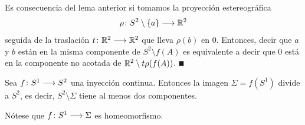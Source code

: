 \documentclass[GTS.tex]{subfiles}
\begin{document}
\begin{dem}
Es consecuencia del lema anterior si tomamos la proyección estereográfica \[\rho\colon{S^2\setminus\{a\}}\longrightarrow{\mathbb{R}^2}\] seguida de la traslación $t\colon{\mathbb{R}^2}\longrightarrow{\mathbb{R}^2}$ que lleva $\rho(b)$ en $0$. Entonces, decir que $a$ y $b$ están en la misma componente de $S^2\setminus f(A)$ es equivalente a decir que $0$ está en la componente no acotada de $\mathbb{R}^2\setminus t\rho(f(A))$. $\QED$
\end{dem}

\begin{prop}
Sea $f\colon{S^1}\longrightarrow{S^2}$ una inyección continua. Entonces la imagen $\Sigma=f(S^1)$ divide a $S^2$, es decir, $S^2\setminus\Sigma$ tiene al menos dos componentes.
\end{prop}

Nótese que $f\colon{S^1}\longrightarrow{\Sigma}$ es homeomorfismo.
\end{document}
